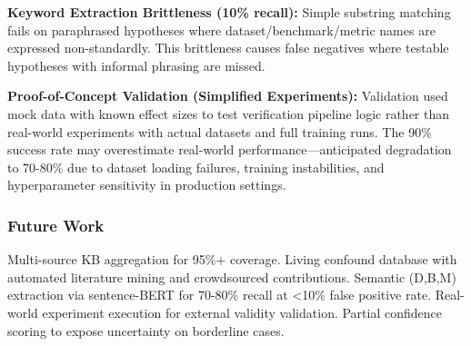 \textbf{Keyword Extraction Brittleness (10\% recall):} Simple substring matching fails on paraphrased hypotheses where dataset/benchmark/metric names are expressed non-standardly. This brittleness causes false negatives where testable hypotheses with informal phrasing are missed.

\textbf{Proof-of-Concept Validation (Simplified Experiments):} Validation used mock data with known effect sizes to test verification pipeline logic rather than real-world experiments with actual datasets and full training runs. The 90\% success rate may overestimate real-world performance---anticipated degradation to 70-80\% due to dataset loading failures, training instabilities, and hyperparameter sensitivity in production settings.

\subsubsection{Future Work}

Multi-source KB aggregation for 95\%+ coverage. Living confound database with automated literature mining and crowdsourced contributions. Semantic (D,B,M) extraction via sentence-BERT for 70-80\% recall at <10\% false positive rate. Real-world experiment execution for external validity validation. Partial confidence scoring to expose uncertainty on borderline cases.
